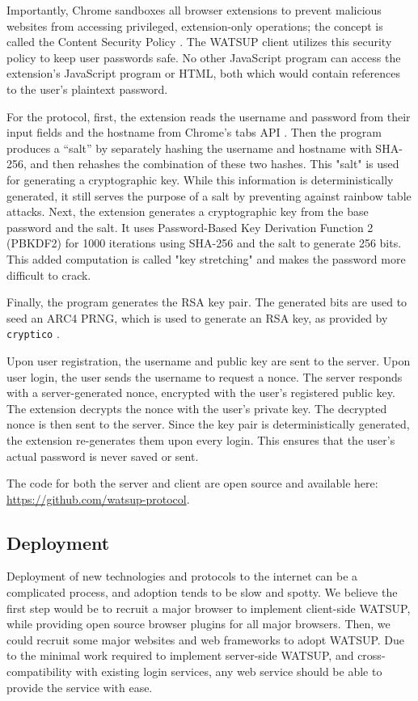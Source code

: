 Importantly, Chrome sandboxes all browser extensions to prevent malicious websites from accessing privileged, extension-only operations; the concept is called the Content Security Policy \cite{Google:2017:contentSecurityPolicy}. The WATSUP client utilizes this security policy to keep user passwords safe. No other JavaScript program can access the extension's JavaScript program or HTML, both which would contain references to the user’s plaintext password.

For the protocol, first, the extension reads the username and password from their input fields and the hostname from Chrome's tabs API \cite{Google:2017:tabs}. Then the program produces a “salt” by separately hashing the username and hostname with SHA-256, and then rehashes the combination of these two hashes. This "salt" is used for generating a cryptographic key. While this information is deterministically generated, it still serves the purpose of a salt by preventing against rainbow table attacks. Next, the extension generates a cryptographic key from the base password and the salt. It uses Password-Based Key Derivation Function 2 (PBKDF2) for 1000 iterations using SHA-256 and the salt to generate 256 bits. This added computation is called "key stretching" and makes the password more difficult to crack.

Finally, the program generates the RSA key pair. The generated bits are used to seed an ARC4 PRNG, which is used to generate an RSA key, as provided by \texttt{cryptico} \cite{Terrell:2017}.

Upon user registration, the username and public key are sent to the server. Upon user login, the user sends the username to request a nonce. The server responds with a server-generated nonce, encrypted with the user's registered public key. The extension decrypts the nonce with the user's private key. The decrypted nonce is then sent to the server. Since the key pair is deterministically generated, the extension re-generates them upon every login. This ensures that the user's actual password is never saved or sent.

The code for both the server and client are open source and available here: \url{https://github.com/watsup-protocol}.

\subsection{Deployment}

Deployment of new technologies and protocols to the internet can be a complicated process, and adoption tends to be slow and spotty. We believe the first step would be to recruit a major browser to implement client-side WATSUP, while providing open source browser plugins for all major browsers. Then, we could recruit some major websites and web frameworks to adopt WATSUP. Due to the minimal work required to implement server-side WATSUP, and cross-compatibility with existing login services, any web service should be able to provide the service with ease.